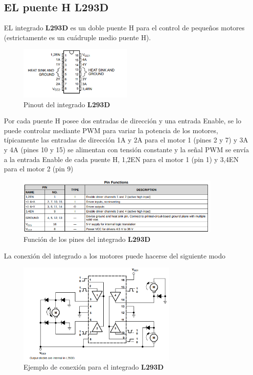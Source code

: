 \documentclass[12pt]{article}
\begin{document}
\subsection{EL puente H \textbf{L293D}}
EL integrado \textbf{L293D} es un doble puente H para el control de pequeños motores (estrictamente es un cuádruple medio puente H).

\begin{figure}[H]
    \centering
    \includegraphics[width=0.5\textwidth]{L293D}
    \caption{Pinout del integrado \textbf{L293D}}
\end{figure}

Por cada puente H posee dos entradas de dirección y una entrada Enable, se lo puede controlar mediante PWM para variar la potencia de los motores, típicamente las entradas de dirección 1A y 2A para el motor 1 (pines 2 y 7) y 3A y 4A (pines 10 y 15) se alimentan con tensión constante y la señal PWM se envía a la entrada Enable de cada puente H, 1,2EN para el motor 1 (pin 1) y 3,4EN para el motor 2 (pin 9)

\begin{figure}[H]
    \centering
    \includegraphics[width=0.9\textwidth]{L293D-pin}
    \caption{Función de los pines del integrado \textbf{L293D}}
\end{figure}

La conexión del integrado a los motores puede hacerse del siguiente modo

\begin{figure}[H]
    \centering
    \includegraphics[width=0.7\textwidth]{L293D-func-block}
    \caption{Ejemplo de conexión para el integrado \textbf{L293D}}
\end{figure}
\end{document}
